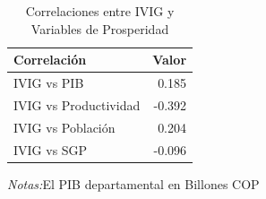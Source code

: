 \documentclass[12pt]{article}
\begin{document}
\setcounter{table}{5}
\begin{table}[htbp]
\centering
\begin{threeparttable}

\caption{Correlaciones entre IVIG y Variables de Prosperidad}
\begin{tabular}[t]{lr}
\toprule
Correlación & Valor\\
\midrule
IVIG vs PIB & 0.185\\
IVIG vs Productividad & -0.392\\
IVIG vs Población & 0.204\\
IVIG vs SGP & -0.096\\
\bottomrule
\end{tabular}
\begin{tablenotes}
\footnotesize
\item \textit{Notas:}El PIB departamental en Billones COP
\end{tablenotes}
\end{threeparttable}
\end{table}
\end{document}
